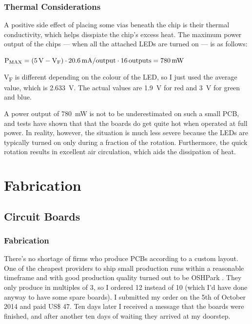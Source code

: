 \documentclass[a4paper, 11pt, titlepage]{report}
\newenvironment{ownmath}
{\vspace{2mm}\hspace{15pt}\begin{math}}
{\end{math}\vspace{2mm}}
\begin{document}
\subsection{Thermal Considerations}

A positive side effect of placing some vias beneath the chip is their thermal conductivity, which
helps disspiate the chip's excess heat. The maximum power output of the chips --- when all the
attached LEDs are turned on --- is as follows:

\begin{ownmath}
\textrm{P\textsubscript{MAX}} = (\SI{5}{\volt} - \textrm{V\textsubscript{F}}) \cdot
\SI{20.6}{\milli\ampere\per output} \cdot \SI{16}{outputs} = \SI{780}{\milli\watt}
\end{ownmath}

V\textsubscript{F} is different depending on the colour of the LED, so I just used the average
value, which is \SI{2.633}{\volt}. The actual values are \SI{1.9}{\volt} for red and \SI{3}{\volt}
for green and blue.

A power output of \SI{780}{\milli\watt} is not to be underestimated on such a small PCB, and tests
have shown that that the boards do get quite hot when operated at full power. In reality, however,
the situation is much less severe because the LEDs are typically turned on only during a fraction
of the rotation. Furthermore, the quick rotation results in excellent air circulation, which aids
the dissipation of heat.









\chapter{Fabrication}

\section{Circuit Boards}

\subsection{Fabrication}

There's no shortage of firms who produce PCBs according to a custom layout. One of the cheapest
providers to ship small production runs within a reasonable timeframe and with good production
quality turned out to be OSHPark \cite{oshpark}. They only produce in multiples of 3, so I ordered
12 instead of 10 (which I'd have done anyway to have some spare boards). I submitted my order on
the 5th of October 2014 and paid US\$ 47. Ten days later I received a message that the boards were
finished, and after another ten days of waiting they arrived at my doorstep.
\end{document}
